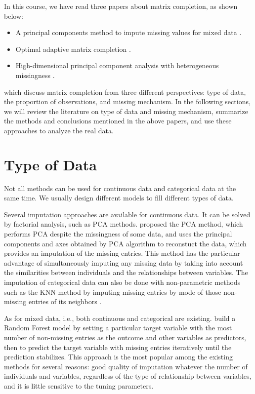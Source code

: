\documentclass[a4paper,12pt,authoryear]{elegantpaper}
\begin{document}
    In this course, we have read three papers about matrix completion, as shown below:
    \begin{itemize}
        \item A principal components method to impute missing values for mixed data \citep{audigier_principal_2013}.
        \item Optimal adaptive matrix completion \citep{ramazanli_optimal_2020}.
        \item High-dimensional principal component analysis with heterogeneous missingness \citep{zhu_high-dimensional_2019}.
    \end{itemize}
    which discuss matrix completion from three different perspectives: type of data, the proportion of observations, and missing mechanism. In the following sections, we will review the literature on type of data and missing mechanism, summarize the methods and conclusions mentioned in the above papers, and use these approaches to analyze the real data.

    \section{Type of Data}

    Not all methods can be used for continuous data and categorical data at the same time. We usually design different models to fill different types of data.

    Several imputation approaches are available for continuous data. 
    It can be solved by factorial analysis, such as PCA methods.
    \citet{kiers_weighted_1997} proposed the PCA method, which performs PCA despite the missingness of some data, and uses the principal components and axes obtained by PCA algorithm to reconstuct the data, which provides an imputation of the missing entries.
    This method has the particular advantage of simultaneously imputing any missing data by taking into account the similarities between individuals and the relationships between variables.
    The imputation of categorical data can also be done with non-parametric methods such as the KNN method by imputing missing entries by mode of those non-missing entries of its neighbors \citep{troyanskaya_missing_2001}.

    As for mixed data, i.e., both continuous and categorical are existing. 
    \citet{stekhoven_missforest--non-parametric_2012} build a Random Forest model by setting a particular target variable with the most number of non-missing entries as the outcome and other variables as predictors, then to predict the target variable with missing entries iteratively until the prediction stabilizes. This approach is the most popular among the existing methods for several reasons: good quality of imputation whatever the number of individuals and variables, regardless of the type of relationship between variables, and it is little sensitive to the tuning parameters.
\end{document}
